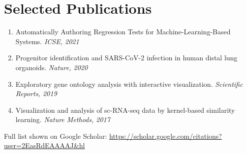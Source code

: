 \documentclass[letterpaper,11pt]{article}
\begin{document}
\section{Selected Publications}
\vspace{0.5em}
  \begin{enumerate}[leftmargin=*, topsep=4pt, parsep=2pt, itemsep=1pt]
    \item Automatically Authoring Regression Tests for Machine-Learning-Based Systems. \textit{ICSE, 2021}
    \item Progenitor identification and SARS-CoV-2 infection in human distal lung organoids. \textit{Nature, 2020}
    \item Exploratory gene ontology analysis with interactive visualization. \textit{Scientific Reports, 2019}
    \item Visualization and analysis of sc-RNA-seq data by kernel-based similarity learning. \textit{Nature Methods, 2017}
  \end{enumerate}
Full list shown on Google Scholar: \url{https://scholar.google.com/citations?user=2EasRdEAAAAJ&hl}
\end{document}

